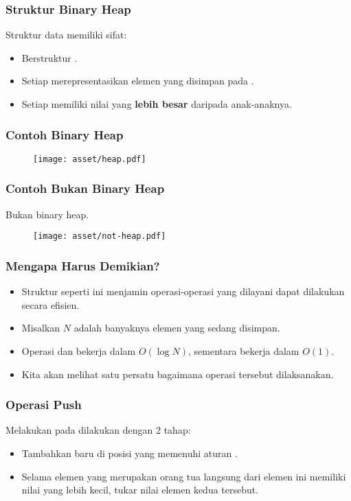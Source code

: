 \begin{frame}
\frametitle{Struktur Binary Heap}
Struktur data \pbinaryHeap memiliki sifat:
\begin{itemize}
  \item Berstruktur .
  \item Setiap \fnode merepresentasikan elemen yang disimpan pada \pheap.
  \item Setiap \fnode memiliki nilai yang \textbf{lebih besar} daripada \fnode anak-anaknya.
\end{itemize}
\end{frame}

\begin{frame}
\frametitle{Contoh Binary Heap}
\begin{figure}
  \texttt{[image: asset/heap.pdf]}
\end{figure}
\end{frame}

\begin{frame}
\frametitle{Contoh Bukan Binary Heap}
Bukan binary heap.
\begin{figure}
  \texttt{[image: asset/not-heap.pdf]}
\end{figure}
\end{frame}

\begin{frame}
\frametitle{Mengapa Harus Demikian?}
\begin{itemize}
  \item Struktur seperti ini menjamin operasi-operasi yang dilayani \pheap dapat dilakukan secara efisien.
  \item Misalkan $N$ adalah banyaknya elemen yang sedang disimpan.
  \item Operasi  dan  bekerja dalam $O(\log{N})$, sementara  bekerja dalam $O(1)$.
  \item Kita akan melihat satu persatu bagaimana operasi tersebut dilaksanakan.
\end{itemize}
\end{frame}

\begin{frame}
\frametitle{Operasi Push}
Melakukan  pada \pbinaryHeap dilakukan dengan 2 tahap:
\begin{itemize}
  \item Tambahkan \fnode baru di posisi yang memenuhi aturan .
  \item Selama elemen \fnode yang merupakan orang tua langsung dari elemen ini memiliki nilai yang lebih kecil, tukar nilai elemen kedua \fnode tersebut.
\end{itemize}
\end{frame}

